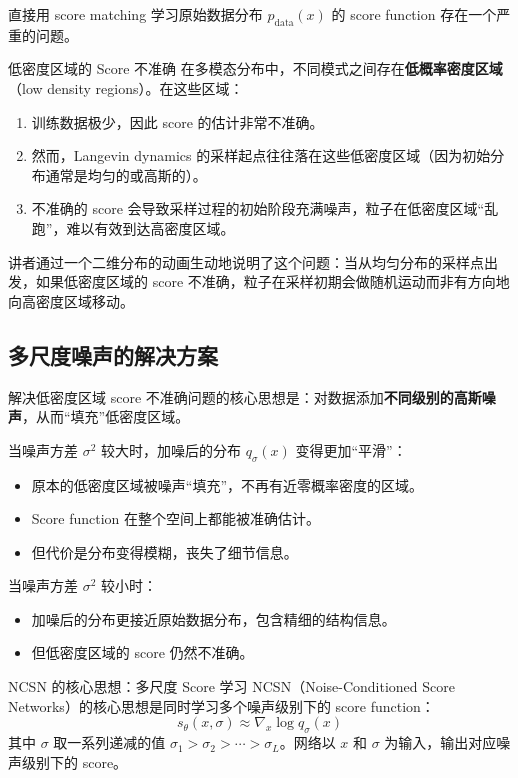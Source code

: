 \documentclass[a4paper]{article}
\begin{document}
直接用 score matching 学习原始数据分布 $p_{\text{data}}(x)$ 的 score function 存在一个严重的问题。

\begin{warningbox}{低密度区域的 Score 不准确}
在多模态分布中，不同模式之间存在\textbf{低概率密度区域}（low density regions）。在这些区域：
\begin{enumerate}
    \item 训练数据极少，因此 score 的估计非常不准确。
    \item 然而，Langevin dynamics 的采样起点往往落在这些低密度区域（因为初始分布通常是均匀的或高斯的）。
    \item 不准确的 score 会导致采样过程的初始阶段充满噪声，粒子在低密度区域``乱跑''，难以有效到达高密度区域。
\end{enumerate}
\end{warningbox}

讲者通过一个二维分布的动画生动地说明了这个问题：当从均匀分布的采样点出发，如果低密度区域的 score 不准确，粒子在采样初期会做随机运动而非有方向地向高密度区域移动。

\subsection{多尺度噪声的解决方案}

解决低密度区域 score 不准确问题的核心思想是：对数据添加\textbf{不同级别的高斯噪声}，从而``填充''低密度区域。

当噪声方差 $\sigma^2$ 较大时，加噪后的分布 $q_\sigma(x)$ 变得更加``平滑''：
\begin{itemize}
    \item 原本的低密度区域被噪声``填充''，不再有近零概率密度的区域。
    \item Score function 在整个空间上都能被准确估计。
    \item 但代价是分布变得模糊，丧失了细节信息。
\end{itemize}

当噪声方差 $\sigma^2$ 较小时：
\begin{itemize}
    \item 加噪后的分布更接近原始数据分布，包含精细的结构信息。
    \item 但低密度区域的 score 仍然不准确。
\end{itemize}

\begin{importantbox}{NCSN 的核心思想：多尺度 Score 学习}
NCSN（Noise-Conditioned Score Networks）的核心思想是同时学习多个噪声级别下的 score function：
$$s_\theta(x, \sigma) \approx \nabla_x \log q_\sigma(x)$$
其中 $\sigma$ 取一系列递减的值 $\sigma_1 > \sigma_2 > \cdots > \sigma_L$。网络以 $x$ 和 $\sigma$ 为输入，输出对应噪声级别下的 score。
\end{importantbox}
\end{document}
